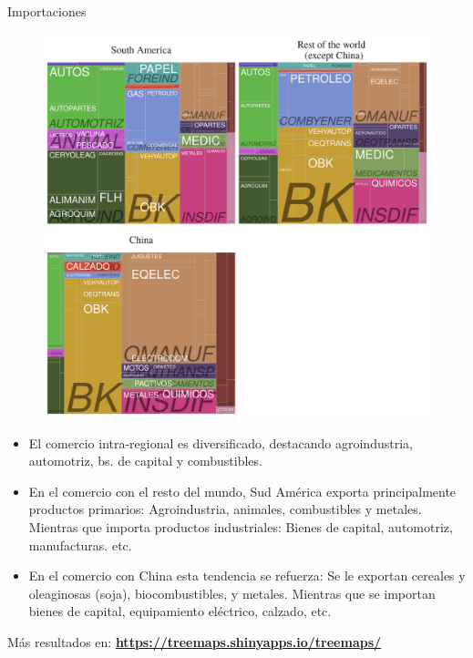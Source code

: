 \documentclass[compress]{beamer}
\begin{document}
\begin{frame}
\tiny Importaciones
\begin{figure}
	\includegraphics[scale=0.35]{treemaps_cadsubcad2016_impos}
\end{figure}

\end{frame}

\begin{frame}
\begin{itemize}[label=\faRebel]
	\item El comercio intra-regional es diversificado, destacando agroindustria, automotriz, bs. de capital y combustibles.
	\item En el comercio con el resto del mundo, Sud América exporta principalmente productos primarios: Agroindustria, animales, combustibles y metales. Mientras que importa productos industriales: Bienes de capital, automotriz, manufacturas. etc. 
	\item En el comercio con China esta tendencia se refuerza: Se le exportan cereales y oleaginosas (soja), biocombustibles, y metales. Mientras que se importan bienes de capital, equipamiento eléctrico, calzado, etc.
\end{itemize}

\small{Más resultados en: \textbf{\url{https://treemaps.shinyapps.io/treemaps/}}}
\end{frame}
\end{document}
